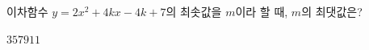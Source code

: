 이차함수 $y=2x^2+4kx-4k+7$의 최솟값을 $m$이라 할 때, $m$의 최댓값은? 
\begin{choices32}{$3$}{$5$}{$7$}{$9$}{$11$}\end{choices32}
